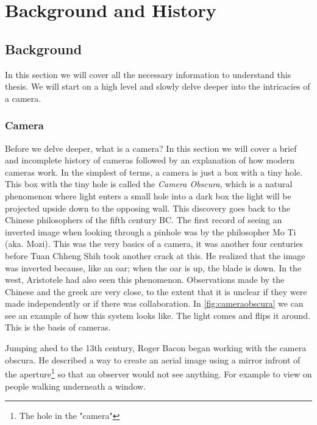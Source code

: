 \chapter{Background and History\label{section:history}}
\section{Background}\label{section:background}
In this section we will cover all the necessary information to understand this
thesis. We will start on a high level and slowly delve deeper into the
intricacies of a camera.

\subsection{Camera}
Before we delve deeper, what is a camera? In this section we will cover a brief
and incomplete history of cameras followed by an explanation of how modern
cameras work. In the simplest of terms, a camera is just a box with a tiny
hole. This box with the tiny hole is called the \textit{Camera Obscura}, which
is a natural phenomenon where light enters a small hole into a dark box the
light will be projected upside down to the opposing wall. This discovery goes
back to the Chinese philosophers of the fifth century BC. The first record of
seeing an inverted image when looking through a pinhole was by the philosopher
Mo Ti\cite{hammond1981camera} (aka. Mozi). This was the very basics of a
camera, it was another four centuries before Tuan Chheng Shih took another
crack at this. He realized that the image was inverted because, like an oar;
when the oar is up, the blade is down. In the west, Aristotele had also seen
this phenomenon. Observations made by the Chinese and the greek are very close,
to the extent that it is unclear if they were made independently or if there
was collaboration. In \cref{fig:cameraobscura} we can see an example of how
this system looks like. The light comes and flips it around. This is the basis
of cameras.

Jumping ahed to the 13th century, Roger Bacon began working with the camera
obscura. He described a way to create an aerial image using a mirror infront of
the aperture\footnote{The hole in the "camera"} so that an observer would not
see anything. For example to view on people walking underneath a window.

